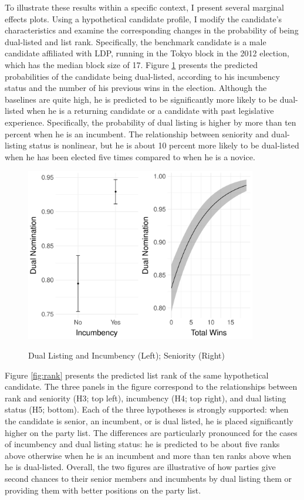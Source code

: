 \documentclass[a4paper, 11pt]{article}
\begin{document}


To illustrate these results within a specific context, I present several marginal effects plots. Using a hypothetical candidate profile, I modify the candidate's characteristics and examine the corresponding changes in the probability of being dual-listed and list rank. Specifically, the benchmark candidate is a male candidate affiliated with LDP, running in the Tokyo block in the 2012 election, which has the median block size of 17. Figure \ref{fig:dual} presents the predicted probabilities of the candidate being dual-listed, according to his incumbency status and the number of his previous wins in the election. Although the baselines are quite high, he is predicted to be significantly more likely to be dual-listed when he is a returning candidate or a candidate with past legislative experience. Specifically, the probability of dual listing is higher by more than ten percent when he is an incumbent. The relationship between seniority and dual-listing status is nonlinear, but he is about 10 percent more likely to be dual-listed when he has been elected five times compared to when he is a novice. 

\begin{figure}[!htbp]
	\caption{Dual Listing and Incumbency (Left); Seniority (Right)}
	\includegraphics[width = 0.9\textwidth]{../figure/paper/h4_h5.pdf}
	\label{fig:dual}
\end{figure}

Figure \ref{fig:rank} presents the predicted list rank of the same hypothetical candidate. The three panels in the figure correspond to the relationships between rank and seniority (H3; top left), incumbency (H4; top right), and dual listing status (H5; bottom). Each of the three hypotheses is strongly supported: when the candidate is senior, an incumbent, or is dual listed, he is placed significantly higher on the party list. The differences are particularly pronounced for the cases of incumbency and dual listing status: he is predicted to be about five ranks above otherwise when he is an incumbent and more than ten ranks above when he is dual-listed. Overall, the two figures are illustrative of how parties give second chances to their senior members and incumbents by dual listing them or providing them with better positions on the party list. 
\end{document}
